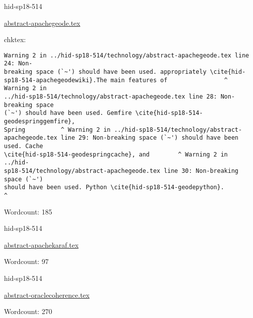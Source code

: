 \begin{IU}

hid-sp18-514

\href{https://github.com/cloudmesh-community/hid-sp18-514/blob/master//technology/abstract-apachegeode.tex}{abstract-apachegeode.tex}

 
chktex:
\begin{tiny}
\begin{verbatim}
Warning 2 in ../hid-sp18-514/technology/abstract-apachegeode.tex line 24: Non-
breaking space (`~') should have been used. appropriately \cite{hid-
sp18-514-apachegeodewiki}.The main features of                ^ Warning 2 in
../hid-sp18-514/technology/abstract-apachegeode.tex line 28: Non-breaking space
(`~') should have been used. Gemfire \cite{hid-sp18-514-geodespringgemfire},
Spring          ^ Warning 2 in ../hid-sp18-514/technology/abstract-
apachegeode.tex line 29: Non-breaking space (`~') should have been used. Cache
\cite{hid-sp18-514-geodespringcache}, and        ^ Warning 2 in ../hid-
sp18-514/technology/abstract-apachegeode.tex line 30: Non-breaking space (`~')
should have been used. Python \cite{hid-sp18-514-geodepython}.         ^
\end{verbatim}
\end{tiny}

Wordcount: 185

\end{IU}



\begin{IU}

hid-sp18-514

\href{https://github.com/cloudmesh-community/hid-sp18-514/blob/master//technology/abstract-apachekaraf.tex}{abstract-apachekaraf.tex}

 

Wordcount: 97

\end{IU}



\begin{IU}

hid-sp18-514

\href{https://github.com/cloudmesh-community/hid-sp18-514/blob/master//technology/abstract-oraclecoherence.tex}{abstract-oraclecoherence.tex}

 

Wordcount: 270

\end{IU}

